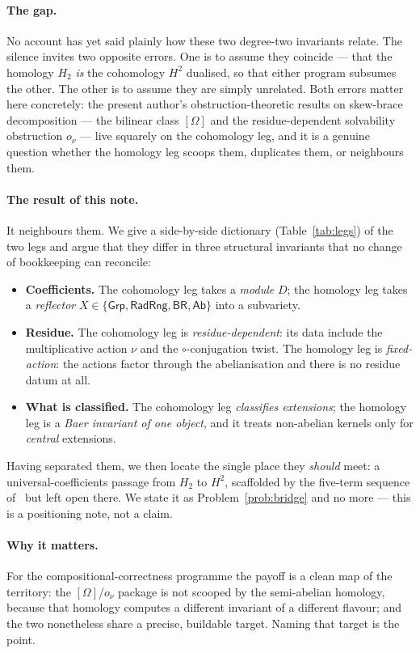 \documentclass[11pt]{article}
\theoremstyle{definition}
\newcommand{\Grp}{\mathsf{Grp}}
\newcommand{\Ab}{\mathsf{Ab}}
\newcommand{\RadRng}{\mathsf{RadRng}}
\newcommand{\BR}{\mathsf{BR}}
\begin{document}
\paragraph{The gap.}
No account has yet said plainly how these two degree-two invariants relate. The silence
invites two opposite errors. One is to assume they coincide --- that the homology $H_2$
\emph{is} the cohomology $H^2$ dualised, so that either program subsumes the other. The
other is to assume they are simply unrelated. Both errors matter here concretely: the
present author's obstruction-theoretic results on skew-brace decomposition --- the bilinear
class $[\Omega]$ and the residue-dependent solvability obstruction $o_\nu$ --- live squarely
on the cohomology leg, and it is a genuine question whether the homology leg scoops them,
duplicates them, or neighbours them.

\paragraph{The result of this note.}
It neighbours them. We give a side-by-side dictionary (Table~\ref{tab:legs}) of the two legs
and argue that they differ in three structural invariants that no change of bookkeeping can
reconcile:
\begin{itemize}
\item[(i)] \textbf{Coefficients.} The cohomology leg takes a \emph{module} $D$; the homology
leg takes a \emph{reflector} $X\in\{\Grp,\RadRng,\BR,\Ab\}$ into a subvariety.
\item[(ii)] \textbf{Residue.} The cohomology leg is \emph{residue-dependent}: its data
include the multiplicative action $\nu$ and the $\circ$-conjugation twist. The homology leg
is \emph{fixed-action}: the actions factor through the abelianisation and there is no residue
datum at all.
\item[(iii)] \textbf{What is classified.} The cohomology leg \emph{classifies extensions};
the homology leg is a \emph{Baer invariant of one object}, and it treats non-abelian kernels
only for \emph{central} extensions.
\end{itemize}
Having separated them, we then locate the single place they \emph{should} meet: a universal-coefficients
passage from $H_2$ to $H^2$, scaffolded by the five-term sequence of~\cite{GLV} but left open
there. We state it as Problem~\ref{prob:bridge} and no more --- this is a positioning note,
not a claim.

\paragraph{Why it matters.}
For the compositional-correctness programme the payoff is a clean map of the territory: the
$[\Omega]$/$o_\nu$ package is not scooped by the semi-abelian homology, because that homology
computes a different invariant of a different flavour; and the two nonetheless share a precise,
buildable target. Naming that target is the point.
\end{document}
